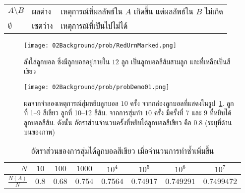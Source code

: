 \begin{table}[hbtp]
\begin{center}
\begin{tabular}{lll}
				$A \setminus B$ & ผลต่าง  & เหตุการณ์ที่ผลลัพธ์ใน $A$ เกิดขึ้น แต่ผลลัพธ์ใน $B$ ไม่เกิด \\
				
				
				
				$\emptyset$ & เซตว่าง & เหตุการณ์ที่เป็นไปไม่ได้ \\
				
				\hline
			\end{tabular} 
		\end{center}
		\label{tbl: prob set jargon}
\end{table}






%
\begin{figure}
	\begin{center}
		\texttt{[image: 02Background/prob/RedUrnMarked.png]}
	\end{center}
	\caption[ตัวอย่างความน่าจะเป็น ลังใส่ลูกบอล]{ลังใส่ลูกบอล ซึ่งมีลูกบอลอยู่ภายใน $12$ ลูก เป็นลูกบอลสีส้มสามลูก และที่เหลือเป็นสีเขียว}
	\label{fig: prob red box}
\end{figure}
%

%
\begin{figure}
	\begin{center}
		\texttt{[image: 02Background/prob/probDemo01.png]}
	\end{center}
	\caption[ผลจากจำลองสุ่มหยิบลูกบอล]{ผลจากจำลองเหตุการณ์สุ่มหยิบลูกบอล $10$ ครั้ง จากกล่องลูกบอลที่แสดงในรูป~\ref{fig: prob red box}.
		ลูกที่ 1--9 สีเขียว ลูกที่ 10--12 สีส้ม.
		จากการสุ่มทำ $10$ ครั้ง มีครั้งที่ 7 และ 9 ที่หยิบได้ลูกบอลสีส้ม.
		ดังนั้น อัตราส่วนจำนวนครั้งที่หยิบได้ลูกบอลสีเขียว คือ $0.8$ (ระบุที่ด้านบนของภาพ)}
	\label{fig: prob red box result N 10}
\end{figure}
%

\begin{table}[hbtp]
		\caption[อัตราส่วนของการหยิบได้สีเขียว]{อัตราส่วนของการสุ่มได้ลูกบอลสีเขียว เมื่อจำนวนการทำซ้ำเพิ่มขึ้น}
		\begin{center}
			\begin{tabular}{|r|c|c|c|c|c|c|c|}
				\hline 
				$N$ & $10$ & $100$ & $1000$ & $10^4$ & $10^5$ & $10^6$ & $10^7$ \\
				\hline 
				$\frac{N(A)}{N}$ &
				$0.8$  & $0.68$  & $0.754$  & $0.7564$ & $0.74917$ & $0.749291$ &  $0.7499472$ \\
				\hline
			\end{tabular} 
		\end{center}
		\label{tbl: prob demo N(A)/N}
\end{table}

